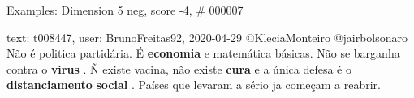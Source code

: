 \begin{frame}{Examples: Dimension 5 neg, score -4, \# 000007}
\footnotesize
\begin{alertblock}{text: t008447, user: BrunoFreitas92, 2020-04-29}
@KleciaMonteiro @jairbolsonaro Não é politica partidária. É \textbf{economia} e 
matemática básicas. Não se barganha contra o \textbf{virus} . Ñ existe vacina, 
não existe \textbf{cura} e a única defesa é o \textbf{distanciamento} 
\textbf{social} . Países que levaram a sério ja começam a reabrir. 
\end{alertblock}
\end{frame}
